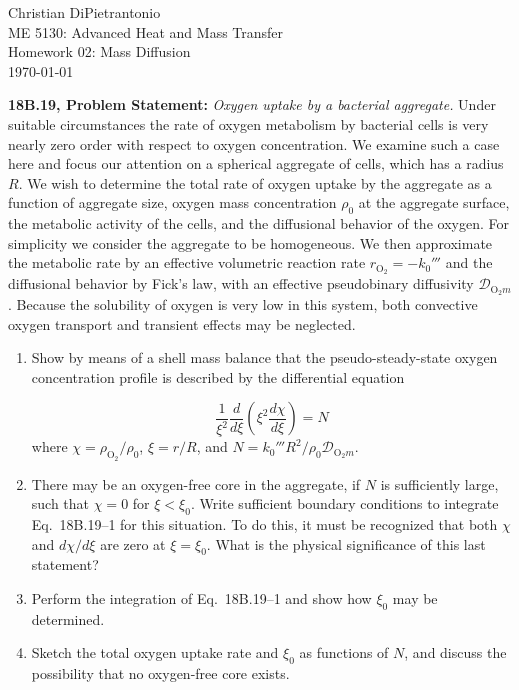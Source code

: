 \documentclass[letterpaper,12pt]{article}
\begin{document}
Christian DiPietrantonio \\
ME 5130: Advanced Heat and Mass Transfer \\
Homework 02: Mass Diffusion \\
\today

\vspace{6pt}

\textbf{18B.19, Problem Statement:}
\textit{Oxygen uptake by a bacterial aggregate.} Under suitable circumstances the rate of oxygen metabolism by bacterial cells is very nearly zero order with respect to oxygen concentration. We examine such a case here and focus our attention on a spherical aggregate of cells, which has a radius $R$. We wish to determine the total rate of oxygen uptake by the aggregate as a function of aggregate size, oxygen mass concentration $\rho_0$ at the aggregate surface, the metabolic activity of the cells, and the diffusional behavior of the oxygen. For simplicity we consider the aggregate to be homogeneous. We then approximate the metabolic rate by an effective volumetric reaction rate $r_{\mathrm{O}_2} = -k_0'''$ and the diffusional behavior by Fick's law, with an effective pseudobinary diffusivity $\mathcal{D}_{\mathrm{O}_2 m}$. Because the solubility of oxygen is very low in this system, both convective oxygen transport and transient effects may be neglected.

\begin{enumerate}
    \item[(a)] Show by means of a shell mass balance that the pseudo-steady-state oxygen concentration profile is described by the differential equation

    \begin{equation}
        \frac{1}{\xi^2} \frac{d}{d\xi} \left( \xi^2 \frac{d\chi}{d\xi} \right) = N
        \tag{18B.19--1}
    \end{equation}
    where $\chi = \rho_{\mathrm{O}_2} / \rho_0$, $\xi = r/R$, and $N = k_0''' R^2 / \rho_0 \mathcal{D}_{\mathrm{O}_2 m}$.

    \item[(b)] There may be an oxygen-free core in the aggregate, if $N$ is sufficiently large, such that $\chi = 0$ for $\xi < \xi_0$. Write sufficient boundary conditions to integrate Eq.~18B.19--1 for this situation. To do this, it must be recognized that both $\chi$ and $d\chi / d\xi$ are zero at $\xi = \xi_0$. What is the physical significance of this last statement?

    \item[(c)] Perform the integration of Eq.~18B.19--1 and show how $\xi_0$ may be determined.

    \item[(d)] Sketch the total oxygen uptake rate and $\xi_0$ as functions of $N$, and discuss the possibility that no oxygen-free core exists.
\end{enumerate}
\end{document}
